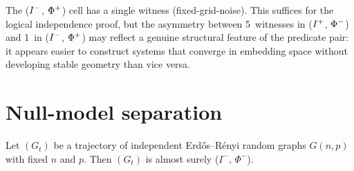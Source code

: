 \documentclass{../shared/primo}
\begin{document}
\begin{remark}
The ($I\textsuperscript{$-$}$, $\Phi\textsuperscript{+}$) cell has a single witness (fixed-grid-noise). This suffices for the logical independence proof, but the asymmetry between 5~witnesses in ($I\textsuperscript{+}$, $\Phi\textsuperscript{$-$}$) and 1~in ($I\textsuperscript{$-$}$, $\Phi\textsuperscript{+}$) may reflect a genuine structural feature of the predicate pair: it appears easier to construct systems that converge in embedding space without developing stable geometry than vice versa.
\end{remark}


\section{Null-model separation}
\label{sec:nullmodel}

\begin{theorem}[ER separation]\label{thm:ersep}
Let $(G_t)$ be a trajectory of independent Erd\H{o}s--R\'enyi random graphs $G(n, p)$ with fixed $n$ and $p$. Then $(G_t)$ is almost surely ($I^-$, $\Phi^-$).
\end{theorem}
\end{document}
